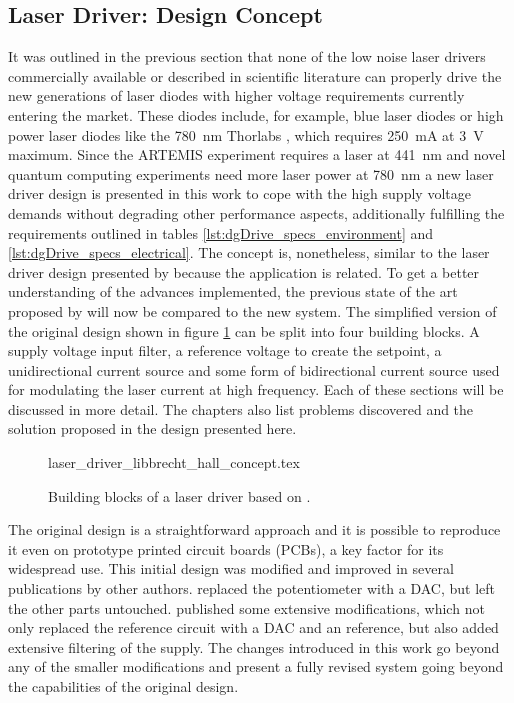 \subsection{Laser Driver: Design Concept}
It was outlined in the previous section that none of the low noise laser drivers commercially available or described in scientific literature can properly drive the new generations of laser diodes with higher voltage requirements currently entering the market. These diodes include, for example, blue laser diodes or high power laser diodes like the \qty{780}{\nm} Thorlabs , which requires \qty{250}{\mA} at \qty{3}{\V} maximum. Since the ARTEMIS experiment requires a laser at \qty{441}{\nm} and novel quantum computing experiments need more laser power at \qty{780}{\nm}  a new laser driver design is presented in this work to cope with the high supply voltage demands without degrading other performance aspects, additionally fulfilling the requirements outlined in tables \ref{lst:dgDrive_specs_environment} and \ref{lst:dgDrive_specs_electrical}. The concept is, nonetheless, similar to the laser driver design presented by \citeauthor{libbrecht_hall} \cite{libbrecht_hall} because the application is related. To get a better understanding of the advances implemented, the previous state of the art proposed by \citeauthor{libbrecht_hall} will now be compared to the new system. The simplified version of the original design shown in figure \ref{fig:laser_driver_libbrecht_hall_concept} can be split into four building blocks. A supply voltage input filter, a reference voltage to create the setpoint, a unidirectional current source and some form of bidirectional current source used for modulating the laser current at high frequency. Each of these sections will be discussed in more detail. The chapters also list problems discovered and the solution proposed in the design presented here.
\begin{figure}[ht]
    \centering
        {laser_driver_libbrecht_hall_concept.tex}
    \caption{Building blocks of a laser driver based on \cite{libbrecht_hall}.}
    \label{fig:laser_driver_libbrecht_hall_concept}
\end{figure}

The original design is a straightforward approach and it is possible to reproduce it even on prototype printed circuit boards (PCBs), a key factor for its widespread use. This initial design was modified and improved in several publications by other authors. \citeauthor{laser_driver_digital} \cite{laser_driver_digital} replaced the potentiometer with a DAC, but left the other parts untouched. \citeauthor{laser_driver_qcl_taubman} \cite{laser_driver_qcl_taubman,laser_driver_qcl_taubman_multiplexer} published some extensive modifications, which not only replaced the reference circuit with a DAC and an  reference, but also added extensive filtering of the supply. The changes introduced in this work go beyond any of the smaller modifications and present a fully revised system going beyond the capabilities of the original design.

